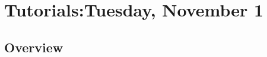 \newcommand{\tutorialauthors}[1]{
    \paperauthor{\citefullauthornames{#1}}}
\chapter{\label{chap:Tutorials}Tutorials:Tuesday, November 1}
\thispagestyle{emptyheader}
\setlength{\parindent}{0in}
\setlength{\parskip}{2ex}
\renewcommand{\baselinestretch}{0.87}
\section*{Overview}
\renewcommand{\arraystretch}{1.2}
%
%





